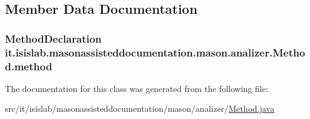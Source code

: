 \subsection{Member Data Documentation}
\hypertarget{classit_1_1isislab_1_1masonassisteddocumentation_1_1mason_1_1analizer_1_1_method_a90dcaceeda469988d15bfb9c5bbb8487}{
\subsubsection[{method}]{\setlength{\rightskip}{0pt plus 5cm}Method\-Declaration it.\-isislab.\-masonassisteddocumentation.\-mason.\-analizer.\-Method.\-method\hspace{0.3cm}{\ttfamily [private]}}}\label{classit_1_1isislab_1_1masonassisteddocumentation_1_1mason_1_1analizer_1_1_method_a90dcaceeda469988d15bfb9c5bbb8487}


The documentation for this class was generated from the following file\-:\begin{DoxyCompactItemize}
\item 
src/it/isislab/masonassisteddocumentation/mason/analizer/\hyperlink{_method_8java}{Method.\-java}\end{DoxyCompactItemize}
